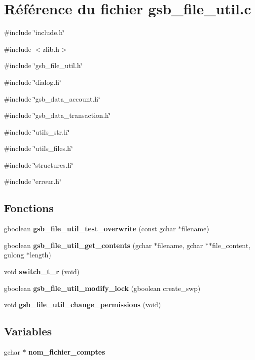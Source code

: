 \section{Référence du fichier gsb\_\-file\_\-util.c}
\label{gsb__file__util_8c}
{\ttfamily \#include \char`\"{}include.h\char`\"{}}\par
{\ttfamily \#include $<$zlib.h$>$}\par
{\ttfamily \#include \char`\"{}gsb\_\-file\_\-util.h\char`\"{}}\par
{\ttfamily \#include \char`\"{}dialog.h\char`\"{}}\par
{\ttfamily \#include \char`\"{}gsb\_\-data\_\-account.h\char`\"{}}\par
{\ttfamily \#include \char`\"{}gsb\_\-data\_\-transaction.h\char`\"{}}\par
{\ttfamily \#include \char`\"{}utils\_\-str.h\char`\"{}}\par
{\ttfamily \#include \char`\"{}utils\_\-files.h\char`\"{}}\par
{\ttfamily \#include \char`\"{}structures.h\char`\"{}}\par
{\ttfamily \#include \char`\"{}erreur.h\char`\"{}}\par
\subsection*{Fonctions}
\begin{DoxyCompactItemize}
\item 
gboolean {\bf gsb\_\-file\_\-util\_\-test\_\-overwrite} (const gchar $\ast$filename)
\item 
gboolean {\bf gsb\_\-file\_\-util\_\-get\_\-contents} (gchar $\ast$filename, gchar $\ast$$\ast$file\_\-content, gulong $\ast$length)
\item 
void {\bf switch\_\-t\_\-r} (void)
\item 
gboolean {\bf gsb\_\-file\_\-util\_\-modify\_\-lock} (gboolean create\_\-swp)
\item 
void {\bf gsb\_\-file\_\-util\_\-change\_\-permissions} (void)
\end{DoxyCompactItemize}
\subsection*{Variables}
\begin{DoxyCompactItemize}
\item 
gchar $\ast$ {\bf nom\_\-fichier\_\-comptes}
\end{DoxyCompactItemize}


